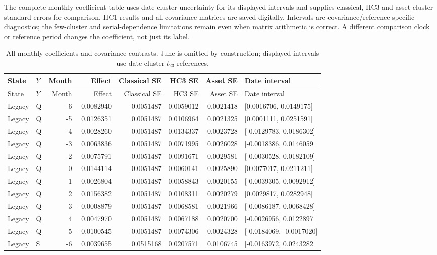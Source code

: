 The complete monthly coefficient table uses date-cluster uncertainty for its displayed intervals and supplies classical, HC3 and asset-cluster standard errors for comparison. HC1 results and all covariance matrices are saved digitally. Intervals are covariance/reference-specific diagnostics; the few-cluster and serial-dependence limitations remain even when matrix arithmetic is correct. A different comparison clock or reference period changes the coefficient, not just its label.

{\footnotesize
\begin{longtable}{llrrrrrl}
\caption{All monthly coefficients and covariance contrasts. June is omitted by construction; displayed intervals use date-cluster $t_{23}$ references.}\label{tab:event_monthly_rebuilt}\\
\toprule State & $Y$ & Month & Effect & Classical SE & HC3 SE & Asset SE & Date interval\\\midrule\endfirsthead
\toprule State & $Y$ & Month & Effect & Classical SE & HC3 SE & Asset SE & Date interval\\\midrule\endhead
\bottomrule\endfoot
Legacy & Q & -6 & 0.0082940 & 0.0051487 & 0.0059012 & 0.0021418 & [0.0016706, 0.0149175]\\
Legacy & Q & -5 & 0.0126351 & 0.0051487 & 0.0106964 & 0.0021325 & [0.0001111, 0.0251591]\\
Legacy & Q & -4 & 0.0028260 & 0.0051487 & 0.0134337 & 0.0023728 & [-0.0129783, 0.0186302]\\
Legacy & Q & -3 & 0.0063836 & 0.0051487 & 0.0071995 & 0.0026028 & [-0.0018386, 0.0146059]\\
Legacy & Q & -2 & 0.0075791 & 0.0051487 & 0.0091671 & 0.0029581 & [-0.0030528, 0.0182109]\\
Legacy & Q & 0 & 0.0144114 & 0.0051487 & 0.0060141 & 0.0025890 & [0.0077017, 0.0211211]\\
Legacy & Q & 1 & 0.0026804 & 0.0051487 & 0.0058843 & 0.0020155 & [-0.0039305, 0.0092912]\\
Legacy & Q & 2 & 0.0156382 & 0.0051487 & 0.0108311 & 0.0020279 & [0.0029817, 0.0282948]\\
Legacy & Q & 3 & -0.0008879 & 0.0051487 & 0.0068581 & 0.0021966 & [-0.0086187, 0.0068428]\\
Legacy & Q & 4 & 0.0047970 & 0.0051487 & 0.0067188 & 0.0020700 & [-0.0026956, 0.0122897]\\
Legacy & Q & 5 & -0.0100545 & 0.0051487 & 0.0074306 & 0.0024328 & [-0.0184069, -0.0017020]\\
Legacy & S & -6 & 0.0039655 & 0.0515168 & 0.0207571 & 0.0106745 & [-0.0163972, 0.0243282]\\

\end{longtable}}
